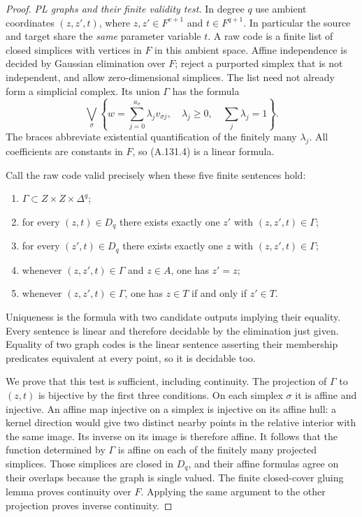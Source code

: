 \begin{proof}
\emph{PL graphs and their finite validity test.}
In degree $q$ use ambient coordinates $(z,z',t)$, where
$z,z'\in F^{v+1}$ and $t\in F^{q+1}$. In particular the source
and target share the \emph{same} parameter variable $t$.
A raw code is a finite list of closed simplices with vertices in $F$
in this ambient space. Affine independence is decided by Gaussian
elimination over $F$; reject a purported simplex that is not
independent, and allow zero-dimensional simplices. The list need not
already form a simplicial complex. Its union $\Gamma$ has the formula
\[
 \bigvee_{\sigma}
 \left\{w=\sum_{j=0}^{a_\sigma}\lambda_jv_{\sigma j},\quad
            \lambda_j\ge0,\quad\sum_j\lambda_j=1\right\}.
                                                        \tag{A.131.4}
\]
The braces abbreviate existential quantification of the finitely
many $\lambda_j$. All coefficients are constants in $F$, so
(A.131.4) is a linear formula.

Call the raw code valid precisely when these five finite sentences
hold:
\begin{enumerate}
\item $\Gamma\subset Z\times Z\times\Delta^q$;
\item for every $(z,t)\in D_q$ there exists exactly one $z'$ with
$(z,z',t)\in\Gamma$;
\item for every $(z',t)\in D_q$ there exists exactly one $z$ with
$(z,z',t)\in\Gamma$;
\item whenever $(z,z',t)\in\Gamma$ and $z\in A$, one has $z'=z$;
\item whenever $(z,z',t)\in\Gamma$, one has $z\in T$ if and only if
$z'\in T$.
\end{enumerate}
Uniqueness is the formula with two candidate outputs implying their
equality. Every sentence is linear and therefore decidable by the
elimination just given. Equality of two graph codes is the linear
sentence asserting their membership predicates equivalent at every
point, so it is decidable too.

We prove that this test is sufficient, including continuity. The
projection of $\Gamma$ to $(z,t)$ is bijective by the first three
conditions. On each simplex $\sigma$ it is affine and injective.
An affine map injective on a simplex is injective on its affine hull:
a kernel direction would give two distinct nearby points in the
relative interior with the same image. Its inverse on its image is
therefore affine. It follows that the function determined by
$\Gamma$ is affine on each of the finitely many projected simplices.
Those simplices are closed in $D_q$, and their affine formulas agree
on their overlaps because the graph is single valued. The finite
closed-cover gluing lemma proves continuity over $F$. Applying the
same argument to the other projection proves inverse continuity.


\end{proof}
